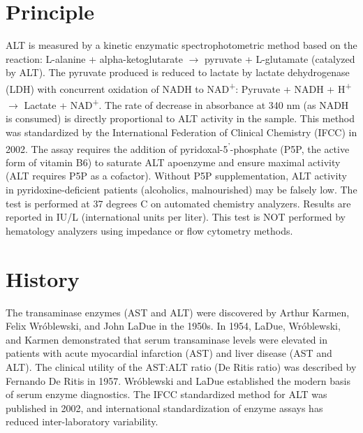 \section*{Principle}
ALT is measured by a kinetic enzymatic spectrophotometric method based on the reaction: L-alanine + alpha-ketoglutarate $\rightarrow$ pyruvate + L-glutamate (catalyzed by ALT). The pyruvate produced is reduced to lactate by lactate dehydrogenase (LDH) with concurrent oxidation of NADH to NAD\textsuperscript{+}: Pyruvate + NADH + H\textsuperscript{+} $\rightarrow$ Lactate + NAD\textsuperscript{+}. The rate of decrease in absorbance at 340 nm (as NADH is consumed) is directly proportional to ALT activity in the sample. This method was standardized by the International Federation of Clinical Chemistry (IFCC) in 2002. The assay requires the addition of pyridoxal-5\textsuperscript{'}-phosphate (P5P, the active form of vitamin B6) to saturate ALT apoenzyme and ensure maximal activity (ALT requires P5P as a cofactor). Without P5P supplementation, ALT activity in pyridoxine-deficient patients (alcoholics, malnourished) may be falsely low. The test is performed at 37 degrees C on automated chemistry analyzers. Results are reported in IU/L (international units per liter). This test is NOT performed by hematology analyzers using impedance or flow cytometry methods.

\section*{History}
The transaminase enzymes (AST and ALT) were discovered by Arthur Karmen, Felix Wr\'{o}blewski, and John LaDue in the 1950s. In 1954, LaDue, Wr\'{o}blewski, and Karmen demonstrated that serum transaminase levels were elevated in patients with acute myocardial infarction (AST) and liver disease (AST and ALT). The clinical utility of the AST:ALT ratio (De Ritis ratio) was described by Fernando De Ritis in 1957. Wr\'{o}blewski and LaDue established the modern basis of serum enzyme diagnostics. The IFCC standardized method for ALT was published in 2002, and international standardization of enzyme assays has reduced inter-laboratory variability.

